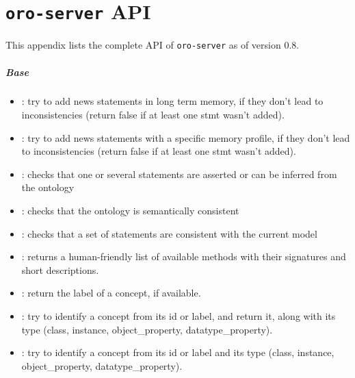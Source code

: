 \chapter{{\tt oro-server} API}

This appendix lists the complete API of {\tt oro-server} as of version 0.8.

\paragraph{Base}
\begin{itemize}

    \item {}: try to add news statements in long term
    memory, if they don't lead to inconsistencies (return false if at least one
    stmt wasn't added).

    \item {}: try to add news statements with a
    specific memory profile, if they don't lead to inconsistencies (return
    false if at least one stmt wasn't added).

    \item {}: checks that one or several statements are
    asserted or can be inferred from the ontology

    \item {}: checks that the ontology is
    semantically consistent

    \item {}: checks that a set of statements
    are consistent with the current model

    \item {}: returns a human-friendly list of available
    methods with their signatures and short descriptions.

    \item {}: return the label of a concept, if
    available.

    \item {}: try to identify a concept from its id or
    label, and return it, along with its type (class, instance,
    object\_property, datatype\_property).

    \item {}: try to identify a concept from
    its id or label and its type (class, instance, object\_property,
    datatype\_property).


\end{itemize}

